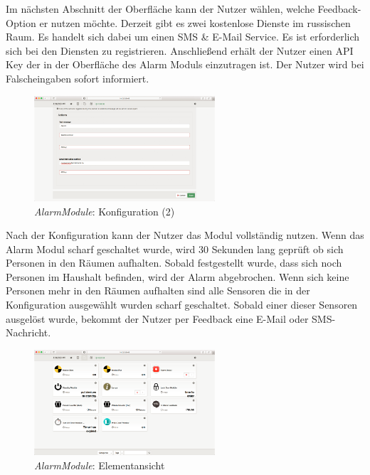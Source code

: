 Im nächsten Abschnitt der Oberfläche kann der Nutzer wählen, welche Feedback-Option er nutzen möchte. Derzeit gibt es zwei kostenlose Dienste im russischen Raum. Es handelt sich dabei um einen SMS \& E-Mail Service. Es ist erforderlich sich bei den Diensten zu registrieren. Anschließend erhält der Nutzer einen API Key der in der Oberfläche des Alarm Moduls einzutragen ist. Der Nutzer wird bei Falscheingaben sofort informiert.

\begin{figure}[h!]
	\centering
	\includegraphics[width=0.6\textwidth]{img/Modulkonzeption/AlarmModule3.png}
	\caption{\emph{AlarmModule}: Konfiguration (2)}
	\label{fig:alarmModule3}
\end{figure}

Nach der Konfiguration kann der Nutzer das Modul vollständig nutzen. Wenn das Alarm Modul scharf geschaltet wurde, wird 30 Sekunden lang geprüft ob sich Personen in den Räumen aufhalten. Sobald festgestellt wurde, dass sich noch Personen im Haushalt befinden, wird der Alarm abgebrochen. Wenn sich keine Personen mehr in den Räumen aufhalten sind alle Sensoren die in der Konfiguration ausgewählt wurden scharf geschaltet. Sobald einer dieser Sensoren ausgelöst wurde, bekommt der Nutzer per Feedback eine E-Mail oder SMS-Nachricht.

\begin{figure}[h!]
	\centering
	\includegraphics[width=0.6\textwidth]{img/Modulkonzeption/AlarmModule4.png}
	\caption{\emph{AlarmModule}: Elementansicht}
	\label{fig:alarmModule4}
\end{figure}

